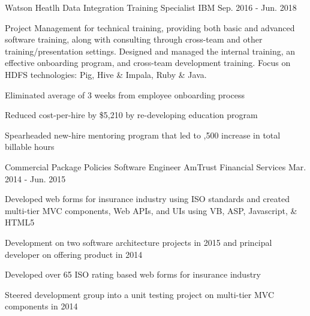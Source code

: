 \begin{cventries}
  \cventry
    {Watson Heatlh} %
    {Data Integration Training Specialist} %
    {IBM} %
    {Sep. 2016 - Jun. 2018} %
    {
      \begin{cvparagraph}
        Project Management for technical training, providing both basic and advanced software training, along with consulting through cross-team and other training/presentation settings.  Designed and managed the internal training, an effective onboarding program, and cross-team development training.  Focus on HDFS technologies: Pig, Hive \& Impala, Ruby \& Java.  
      \end{cvparagraph}
      \begin{cvitems} %
        \item {Eliminated average of 3 weeks from employee onboarding process}
        \item {Reduced cost-per-hire by \$5,210 by re-developing education program}
        \item {Spearheaded new-hire mentoring program that led to ,500 increase in total billable hours}
      \end{cvitems}
    }

  \cventry
    {Commercial Package Policies} %
    {Software Engineer} %
    {AmTrust Financial Services} %
    {Mar. 2014 - Jun. 2015} %
    {
      \begin{cvparagraph}
        Developed web forms for insurance industry using ISO standards and created multi-tier MVC components, Web APIs, and UIs using VB, ASP, Javascript, \& HTML5
      \end{cvparagraph}
      \begin{cvitems} %
        \item {Development on two software architecture projects in 2015 and principal developer on offering product in 2014}
        \item {Developed over 65 ISO rating based web forms for insurance industry}
        \item {Steered development group into a unit testing project on multi-tier MVC components in 2014}
      \end{cvitems}
    }


\end{cventries}
